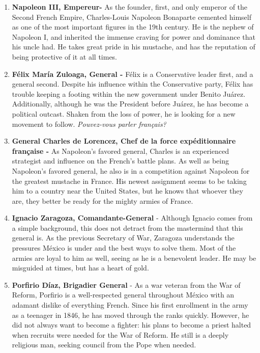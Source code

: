 \documentclass[10pt, letterpaper]{article}
\begin{document}
\begin{enumerate}
\def\labelenumi{\arabic{enumi}.}
\item
  
  \textbf{Napoleon III, Empereur-} As the founder, first, and only
  emperor of the Second French Empire, Charles-Louis Napoleon Bonaparte
  cemented himself as one of the most important figures in the 19th
  century. He is the nephew of Napoleon I, and inherited the immense
  craving for power and dominance that his uncle had. He takes great
  pride in his mustache, and has the reputation of being protective of
  it at all times.
  
\item
  
  \textbf{Félix María Zuloaga, General -} Félix is a Conservative leader
  first, and a general second. Despite his influence within the
  Conservative party, Félix has trouble keeping a footing within the new
  government under Benito Juárez. Additionally, although he was the
  President before Juárez, he has become a political outcast. Shaken
  from the loss of power, he is looking for a new movement to follow.
  \emph{Pouvez-vous parler français?}
  
\item
  
  \textbf{General Charles de Lorencez, Chef de la force expéditionnaire
  française -} As Napoleon's favored general, Charles is an experienced
  strategist and influence on the French's battle plans. As well as
  being Napoleon's favored general, he also is in a competition against
  Napoleon for the greatest mustache in France. His newest assignment
  seems to be taking him to a country near the United States, but he
  knows that whoever they are, they better be ready for the mighty
  armies of France.
  
\item
  
  \textbf{Ignacio Zaragoza, Comandante-General} - Although Ignacio comes
  from a simple background, this does not detract from the mastermind
  that this general is. As the previous Secretary of War, Zaragoza
  understands the pressures México is under and the best ways to solve
  them. Most of the armies are loyal to him as well, seeing as he is a
  benevolent leader. He may be misguided at times, but has a heart of
  gold.
  
\item
  
  \textbf{Porfirio Díaz, Brigadier General} - As a war veteran from the
  War of Reform, Porfirio is a well-respected general throughout México
  with an adamant dislike of everything French. Since his first
  enrollment in the army as a teenager in 1846, he has moved through the
  ranks quickly. However, he did not always want to become a fighter:
  his plans to become a priest halted when recruits were needed for the
  War of Reform. He still is a deeply religious man, seeking council
  from the Pope when needed.
  

\end{enumerate}
\end{document}
